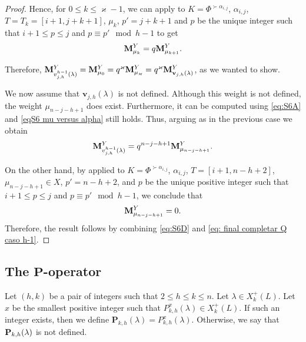 \begin{proof}
Hence, for $0\leq k \leq \varkappa - 1$, we can apply  to $K=\Phi^{\succ\alpha_{i,j} } $, $\alpha_{i,j}$, $T=T_{k}= [i+1,j+k+1]$, $\mu_{k}$, $p' = j+k+1$ and $p$ be the unique integer such that $i+1\leq p\leq j$ and $p\equiv p' \mod{h-1}$ to get
    \begin{equation}
        \mathbf{M}_{\mu_{k}}^{Y} = q\mathbf{M}_{\mu_{k+1}}^{Y}.
    \end{equation}
    
Therefore,  $\mathbf{M}_{v^{h-1}_{j,h}(\lambda)}^{Y} =  \mathbf{M}_{\mu_{0}}^{Y} =q^{\varkappa}  \mathbf{M}_{\mu_{\varkappa}}^{Y} =  q^{\varkappa}\mathbf{M}_{\mathbf{v}_{j,h}(\lambda)}^{Y}$, as we wanted to show.

We now assume that $\mathbf{v}_{j,h}(\lambda)$ is not defined. 
Although this weight is not defined, the weight $\mu_{n-j-h+1}  $ does exist. 
Furthermore, it can be computed using \cref{eq:S6A} and \cref{eqS6 mu versus alpha} still holds. 
Thus, arguing as in the previous case we obtain
\begin{equation}\label{eq:S6D}
    \mathbf{M}_{v^{h-1}_{j,h}(\lambda)}^Y = q^{n-j-h+1} \mathbf{M}_{\mu_{n-j-h+1}}^{Y}.
\end{equation}

 On the other hand, by   applied to $K=\Phi^{\succ \alpha_{i,j} } $, $\alpha_{i,j}$, $T=[i+1,n-h+2]$, $\mu_{n-j-h+1}\in X$, $p'=n-h+2$, and $p$ be the unique positive integer such that $i+1\leq p\leq j$ and $p\equiv p'\mod{h-1}$, we conclude that
    \begin{equation}\label{eq: final completar Q caso h-1}
        \mathbf{M}_{\mu_{n-j-h+1}}^{Y} =0.
    \end{equation}
 Therefore, the result follows by combining  \cref{eq:S6D} and  \eqref{eq: final completar Q caso h-1}. 
\end{proof}


\subsection{The $\mathbf{P}$-operator}


\begin{definition}\rm  \label{def: P negrita}
  Let $(h,k)$ be a pair of integers such that $2\leq h \leq k \leq n$.
  Let $\lambda \in X_{k}^+(L)$. 
  Let $x$ be the smallest positive integer such that $P^{x}_{k,h}(\lambda)\in X_{k}^+(L)$.
  If such an integer exists, then we define $\mathbf{P}_{k,h}(\lambda) =  P^{x}_{k,h}(\lambda)$. 
  Otherwise, we say that  $\mathbf{P}_{k,h}(\lambda)$ is not defined. 
\end{definition}

